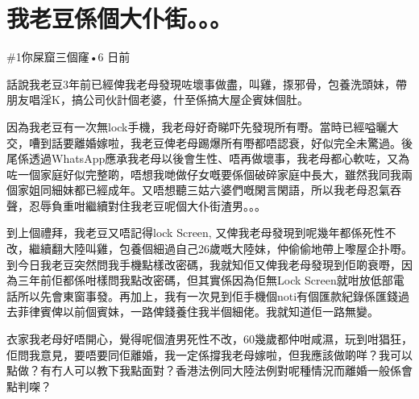 \chapter{我老豆係個大仆街。。。}

\#1你屎窟三個窿•6 日前

話說我老豆3年前已經俾我老母發現咗壞事做盡，叫雞，揼邪骨，包養洗頭妹，帶朋友唱淫K，搞公司伙計個老婆，什至係搞大屋企賓妹個肚。

因為我老豆有一次無lock手機，我老母好奇睇吓先發現所有嘢。當時已經嗌曬大交，嘈到話要離婚嫁啦，我老豆俾老母踢爆所有嘢都唔認衰，好似完全未驚過。後尾係透過WhatsApp應承我老母以後會生性、唔再做壞事，我老母都心軟咗，又為咗一個家庭好似完整啲，唔想我哋做仔女嘅要係個破碎家庭中長大，雖然我同我兩個家姐同細妹都已經成年。又唔想聽三姑六婆們嘅閑言閑語，所以我老母忍氣吞聲，忍辱負重咁繼續對住我老豆呢個大仆街渣男。。。

到上個禮拜，我老豆又唔記得lock Screen, 又俾我老母發現到呢幾年都係死性不改，繼續翻大陸叫雞，包養個細過自己26歲嘅大陸妹，仲偷偷地帶上嚟屋企扑嘢。到今日我老豆突然問我手機點樣改密碼，我就知佢又俾我老母發現到佢啲衰嘢，因為三年前佢都係咁樣問我點改密碼，但其實係因為佢無Lock Screen就咁放低部電話所以先會東窗事發。再加上，我有一次見到佢手機個noti有個匯款紀錄係匯錢過去菲律賓俾以前個賓妹，一路俾錢養住我半個細佬。我就知道佢一路無變。

衣家我老母好唔開心，覺得呢個渣男死性不改，60幾歲都仲咁咸濕，玩到咁猖狂，佢問我意見，要唔要同佢離婚，我一定係撐我老母嫁啦，但我應該做啲咩？我可以點做？有冇人可以教下我點面對？香港法例同大陸法例對呢種情況而離婚一般係會點判㗎？

